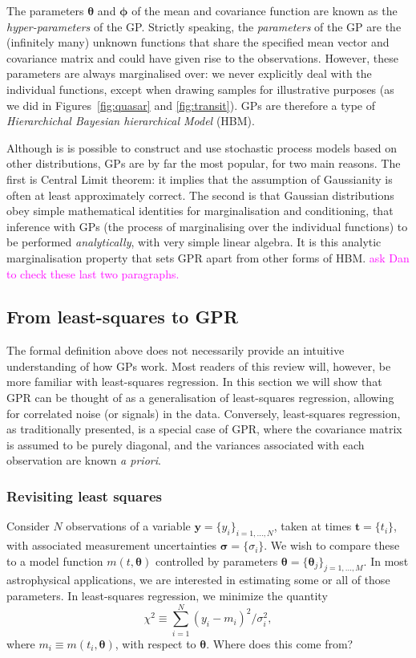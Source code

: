\documentclass[letterpaper]{ar-1col}
\newcommand{\suz}[1]{\textcolor{magenta}{#1}}
\newcommand{\hyperparams}{\ensuremath{\boldsymbol{\phi}}}
\newcommand{\meanparams}{\ensuremath{\boldsymbol{\theta}}}
\begin{document}
The parameters $\meanparams$ and $\hyperparams$ of the mean and covariance function are known as the \textit{hyper-parameters} of the GP. Strictly speaking, the \textit{parameters} of the GP are the (infinitely many) unknown functions that share the specified mean vector and covariance matrix and could have given rise to the observations. However, these parameters are always marginalised over: we never explicitly deal with the individual functions, except when drawing samples for illustrative purposes (as we did in Figures~\ref{fig:quasar} and \ref{fig:transit}). GPs are therefore a type of \textit{Hierarchichal Bayesian hierarchical Model} (HBM). 

Although is is possible to construct and use stochastic process models based on other distributions, GPs are by far the most popular, for two main reasons. The first is Central Limit theorem: it implies that the assumption of Gaussianity is often at least approximately correct. The second is that Gaussian distributions obey simple mathematical identities for marginalisation and conditioning, that inference with GPs (the process of marginalising over the individual functions) to be performed \textit{analytically}, with very simple linear algebra. It is this analytic marginalisation property that sets GPR apart from other forms of HBM. \suz{ask Dan to check these last two paragraphs.}

\subsection{From least-squares to GPR}
\label{sec:from_lsq}

The formal definition above does not necessarily provide an intuitive understanding of how GPs work. Most readers of this review will, however, be more familiar with least-squares regression. In this section we will show that GPR can be thought of as a generalisation of least-squares regression, allowing for correlated noise (or signals) in the data. Conversely, least-squares regression, as traditionally presented, is a special case of GPR, where the covariance matrix is assumed to be purely diagonal, and the variances associated with each observation are known \textit{a priori}.

\subsubsection{Revisiting least squares}\label{sec:lsq}

Consider $N$ observations of a variable $\mathbf{y} = \{ y_i\}_{i=1, \ldots, N}$, taken at times $\mathbf{t} = \{ t_i\}$, with associated measurement uncertainties $\boldsymbol{\sigma}=\{\sigma_i\}$. We wish to compare these to a model function $m(t,\meanparams)$ controlled by parameters $\meanparams=\{\meanparams_j\}_{j=1,\ldots,M}$. In most astrophysical applications, we are interested in estimating some or all of those parameters. In least-squares regression, we minimize the quantity
\begin{equation}
  \chi^2 \equiv\sum_{i=1}^N (y_i-m_i)^2/\sigma^2_i,
\end{equation}
where $m_i \equiv m(t_i,\meanparams)$, with respect to $\meanparams$. Where does this come from?
\end{document}
